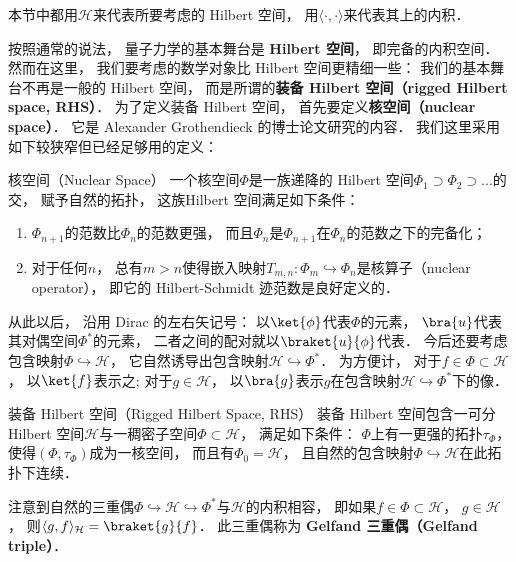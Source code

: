 
本节中都用$\mathcal{H}$来代表所要考虑的 Hilbert 空间， 用$\langle\cdot,\cdot\rangle$来代表其上的内积． 

按照通常的说法， 量子力学的基本舞台是 \textbf{Hilbert 空间}， 即完备的内积空间． 然而在这里， 我们要考虑的数学对象比 Hilbert 空间更精细一些： 我们的基本舞台不再是一般的 Hilbert 空间， 而是所谓的\textbf{装备 Hilbert 空间（rigged Hilbert space, RHS）}． 为了定义装备 Hilbert 空间， 首先要定义\textbf{核空间（nuclear space）}． 它是 Alexander Grothendieck 的博士论文研究的内容． 我们这里采用如下较狭窄但已经足够用的定义：

\begin{definition}{核空间（Nuclear Space）}
一个核空间$\Phi$是一族递降的 Hilbert 空间$\Phi_1\supset\Phi_2\supset...$的交， 赋予自然的拓扑， 这族Hilbert 空间满足如下条件：
\begin{enumerate}
\item $\Phi_{n+1}$的范数比$\Phi_n$的范数更强， 而且$\Phi_n$是$\Phi_{n+1}$在$\Phi_n$的范数之下的完备化；
\item 对于任何$n$， 总有$m>n$使得嵌入映射$T_{m,n}:\Phi_{m}\hookrightarrow\Phi_n$是核算子（nuclear operator）， 即它的 Hilbert-Schmidt 迹范数是良好定义的．
\end{enumerate}
\end{definition}

    从此以后， 沿用 Dirac 的左右矢记号： 以$\ket{\phi}$代表$\Phi$的元素， $\bra{u}$代表其对偶空间$\Phi^*$的元素， 二者之间的配对就以$\braket{u}{\phi}$代表． 今后还要考虑包含映射$\Phi\hookrightarrow\mathcal{H}$， 它自然诱导出包含映射$\mathcal{H}\hookrightarrow\Phi^*$． 为方便计， 对于$f\in\Phi\subset\mathcal{H}$， 以$\ket{f}$表示之; 对于$g\in\mathcal{H}$， 以$\bra{g}$表示$g$在包含映射$\mathcal{H}\hookrightarrow\Phi^*$下的像．

\begin{definition}{装备 Hilbert 空间（Rigged Hilbert Space, RHS）}
装备 Hilbert 空间包含一可分 Hilbert 空间$\mathcal{H}$与一稠密子空间$\Phi\subset\mathcal{H}$， 满足如下条件： $\Phi$上有一更强的拓扑$\tau_\Phi$， 使得$(\Phi,\tau_\Phi)$成为一核空间， 而且有$\Phi_0=\mathcal{H}$， 且自然的包含映射$\Phi\hookrightarrow\mathcal{H}$在此拓扑下连续．
\end{definition}

    注意到自然的三重偶$\Phi\hookrightarrow\mathcal{H}\hookrightarrow\Phi^*$与$\mathcal{H}$的内积相容， 即如果$f\in\Phi\subset\mathcal{H}$， $g\in\mathcal{H}$， 则$\langle g,f\rangle_{\mathcal{H}}=\braket{g}{f}$． 此三重偶称为 \textbf{Gelfand 三重偶（Gelfand triple）}．

